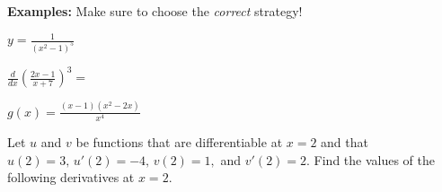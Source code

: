 \documentclass[addpoints, 12pt]{exam}
\begin{document}
\noindent\textbf{Examples:} Make sure to choose the \textit{correct} strategy!
\begin{questions}
    \begin{minipage}{0.45\linewidth}
    \question $\displaystyle y=\frac{1}{(x^2-1)^5}$
    \end{minipage}
    \hfill
    \begin{minipage}{0.45\linewidth}
    \question $\displaystyle\frac{d}{dx}\left(\frac{2x-1}{x+7}\right)^3=$
    \end{minipage}
    
    \newpage
    
    \question $\displaystyle g(x)=\frac{(x-1)(x^2-2x)}{x^4}$
    
    \question Let $u$ and $v$ be functions that are differentiable at $x=2$ and that $u(2)=3,\,u'(2)=-4,\,v(2)=1,$ and $v'(2)=2$. Find the values of the following derivatives at $x=2$.
    
\end{questions}



\newpage
{}
\end{document}
